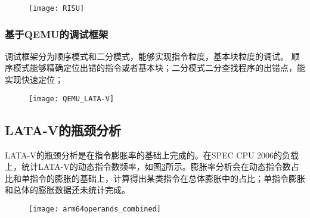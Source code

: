 

\begin{figure}[!htbp]
    \centering
    \texttt{[image: RISU]}
    \label{fig:RISU}
\end{figure}

\subsubsection{基于QEMU的调试框架}
调试框架分为顺序模式和二分模式，能够实现指令粒度，基本块粒度的调试。
顺序模式能够精确定位出错的指令或者基本块；二分模式二分查找程序的出错点，能实现快速定位；

\begin{figure}[!htbp]
    \centering
    \texttt{[image: QEMU\_LATA-V]}
    \label{fig:QEMU_LATA-V}
\end{figure}

\subsection{LATA-V的瓶颈分析}
LATA-V的瓶颈分析是在指令膨胀率的基础上完成的。在SPEC CPU 2006的负载上，统计LATA-V的动态指令数频率，如图\ref{fig:arm64operands_combined}所示。膨胀率分析会在动态指令数占比和单指令的膨胀的基础上，计算得出某类指令在总体膨胀中的占比；单指令膨胀和总体的膨胀数据还未统计完成。

\begin{figure}[!htbp]
    \centering
    \texttt{[image: arm64operands\_combined]}
    \label{fig:arm64operands_combined}
\end{figure}

